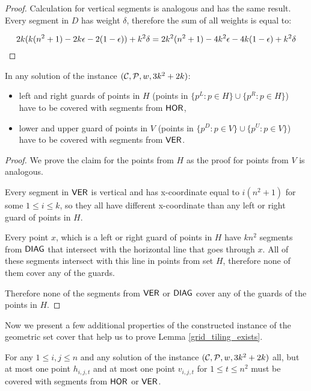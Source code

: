 {{{{\begin{proof}
Calculation for vertical segments is analogous and has the same result.
Every segment in $D$ has weight $\delta$, therefore the sum of all weights
is equal to:

$$2k(k(n^2+1) -2k\epsilon -2(1-\epsilon)) + k^2\delta= 2k^2(n^2+1) - 4k^2\epsilon -4k(1-\epsilon) +k^2\delta$$
\end{proof}


\begin{claim}
\label{guards}
In any solution of the instance $(\mathcal{C}, \mathcal{P}, w, 3k^2+2k)$:
\begin{itemize}
\item left and right guards of points in $H$
(points in $\{p^L : p \in H\} \cup \{p^R : p \in H\}$)
have to be covered with segments from $\mathsf{HOR}$,
\item lower and upper guard of points in $V$
(points in $\{p^D : p \in V\} \cup \{p^U : p \in V\}$)
have to be covered with segments from $\mathsf{VER}$.
\end{itemize}
\end{claim}

\begin{proof}
We prove the claim for the points from $H$
as the proof for points from $V$ is analogous.

Every segment in $\mathsf{VER}$ is vertical and 
has x-coordinate equal to $i(n^2+1)$ for some $1\le i \le k$,
so they all have different x-coordinate
than any left or right guard of points in $H$.

Every point $x$, which is a left or right guard of points in $H$
have $kn^2$ segments from $\mathsf{DIAG}$ that intersect with the horizontal
line that goes through $x$. All of these segments intersect with
this line in points from set $H$, therefore none of them
cover any of the guards.

Therefore none of the segments from $\mathsf{VER}$ or $\mathsf{DIAG}$ cover any
of the guards of the points in $H$.
\end{proof}

Now we present a few additional properties of the constructed instance
of the geometric set cover that help us to prove
Lemma \ref{grid_tiling_exists}.

\begin{claim}
\label{one_diag_in_square}
For any $1 \le i, j \le n$
and any solution of the instance $(\mathcal{C}, \mathcal{P}, w, 3k^2+2k)$
all, but at most one point $h_{i, j, t}$
and at most one point $v_{i, j, t}$
for $1 \le t \le n^2$
must be
covered with segments from $\mathsf{HOR}$ or $\mathsf{VER}$.
\end{claim}

}}}}
